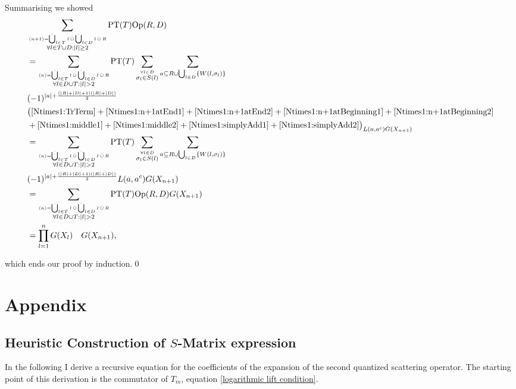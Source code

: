 \documentclass[b5paper,draft,openbib,12pt]{memoir}
\DeclareMathOperator{\dotCup}{\mathop{\dot{\bigcup}}}
\DeclareMathOperator{\dotcup}{\mathop{\dot{\cup}}}
\begin{document}
Summarising we showed 
\begin{align*}
&\sum_{\stackrel{\langle n +1 \rangle = \dotCup_{l\in T} l \dotcup \dotCup_{l\in D} l \dotcup R}{ \forall l \in T \cup D: |l|\ge 2}} \text{PT}(T) \text{Op}(R,D)\\
 &=\sum_{\stackrel{\langle n \rangle = \dotCup_{l\in T}l \dotcup \dotCup_{l\in D} l \dotcup R}{\forall l \in D \cup T: |l|>2} }\text{PT}(T) \sum_{\stackrel{\forall l \in D}{\sigma_l \in S(l)}}  \sum_{a\subseteq R \cup \bigcup_{l\in D}\{W(l,\sigma_l)\}} \\
  & (-1)^{|a|+\frac{(|R|+|D|+1)(|R|+|D|)}{2}}  \\
  &\big( \eqref{Ntimes1:TrTerm}+\eqref{Ntimes1:n+1atEnd1}+\eqref{Ntimes1:n+1atEnd2} 
  +\eqref{Ntimes1:n+1atBeginning1}+\eqref{Ntimes1:n+1atBeginning2}\\
 &+\eqref{Ntimes1:middle1}+\eqref{Ntimes1:middle2}
  +\eqref{Ntimes1:simplyAdd1}+\eqref{Ntimes1:simplyAdd2}\big)_{L(a,a^c) G(X_{n+1})}\\
 &=\sum_{\stackrel{\langle n \rangle = \dotCup_{l\in T}l \dotcup \dotCup_{l\in D} l \dotcup R}{\forall l \in D \cup T: |l|>2} }\text{PT}(T) \sum_{\stackrel{\forall l \in D}{\sigma_l \in S(l)}}  \sum_{a\subseteq R \cup \bigcup_{l\in D}\{W(l,\sigma_l)\}} \\
  & (-1)^{|a|+\frac{(|R|+|D|+1)(|R|+|D|)}{2}} L(a,a^c)G(X_{n+1})\\
  &=\sum_{\stackrel{\langle n \rangle = \dotCup_{l\in T}l \dotcup \dotCup_{l\in D} l \dotcup R}{\forall l \in D \cup T: |l|>2} }\text{PT}(T) \text{Op}(R,D)G(X_{n+1})\\
  &=\prod_{l=1}^n G(X_{l}) \quad G(X_{n+1}),
\end{align*}

which ends our proof by induction.\qed




\appendix

\backmatter

\chapter{Appendix}

\section{Heuristic Construction of \(S\)-Matrix expression}\label{sec:heuristic construction}

In the following I derive a recursive equation for the coefficients of the expansion 
of the second quantized scattering operator. The starting point of this derivation is 
the commutator of \(T_m\), equation \eqref{logarithmic lift condition}.
\end{document}
